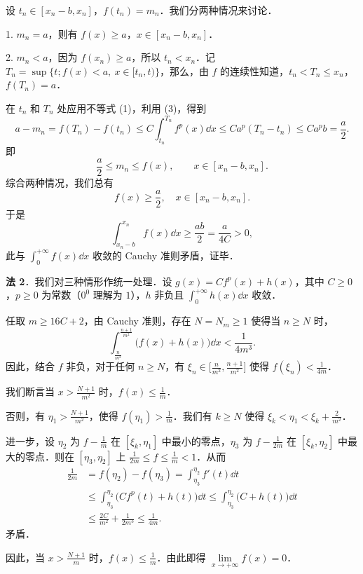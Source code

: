 \begin{solution}
设 $t_{n}\in[x_{n}-b,x_{n}]$，$f(t_{n})=m_{n}$．我们分两种情况来讨论．

1. $m_{n}=a$，则有 $f(x)\ge a$，$x\in[x_{n}-b,x_{n}]$．

2. $m_{n}<a$，因为 $f(x_{n})\ge a$，所以 $t_{n}<x_{n}$．记 $T_{n}=\sup\{t;f(x)<a,\ x\in[t_{n},t)\}$，那么，由 $f$ 的连续性知道，$t_{n}<T_{n}\le x_{n}$，$f(T_{n})=a$．

在 $t_{n}$ 和 $T_{n}$ 处应用不等式 (1)，利用 (3)，得到
\[
a-m_{n}=f(T_{n})-f(t_{n})\le C\int_{t_{n}}^{T_{n}}f^{p}(x)\dd x\le Ca^{p}(T_{n}-t_{n})\le Ca^{p}b=\frac{a}{2}.
\]
即
\[
\frac{a}{2}\le m_{n}\le f(x),\qquad x\in[x_{n}-b,x_{n}].
\]
综合两种情况，我们总有
\[
f(x)\ge\frac{a}{2},\quad x\in[x_{n}-b,x_{n}].
\]
于是
\[
\int_{x_{n}-b}^{x_{n}}f(x)\dd x\ge\frac{ab}{2}=\frac{a}{4C}>0,
\]
此与 $\int_{0}^{+\infty}f(x)\dd x$ 收敛的 Cauchy 准则矛盾，证毕．

\textbf{法 2}．我们对三种情形作统一处理．设 $g(x)=Cf^{p}(x)+h(x)$，其中 $C\ge 0$，$p\ge 0$ 为常数（$0^{0}$ 理解为 $1$），$h$ 非负且 $\int_{0}^{+\infty}h(x)\dd x$ 收敛．

任取 $m\ge 16C+2$，由 Cauchy 准则，存在 $N=N_{m}\ge 1$ 使得当 $n\ge N$ 时，
\[
\int_{\frac{n}{m^{2}}}^{\frac{n+1}{m^{2}}}\bigl(f(x)+h(x)\bigr)\dd x<\frac{1}{4m^{3}}.
\]
因此，结合 $f$ 非负，对于任何 $n\ge N$，有 $\xi_{n}\in\bigl[\frac{n}{m^{2}},\frac{n+1}{m^{2}}\bigr]$ 使得 $f(\xi_{n})<\frac{1}{4m}$．

我们断言当 $x>\frac{N+1}{m^{2}}$ 时，$f(x)\le\frac{1}{m}$．

否则，有 $\eta_{1}>\frac{N+1}{m^{2}}$，使得 $f(\eta_{1})>\frac{1}{m}$．我们有 $k\ge N$ 使得 $\xi_{k}<\eta_{1}<\xi_{k}+\frac{2}{m^{2}}$．

进一步，设 $\eta_{2}$ 为 $f-\frac{1}{m}$ 在 $[\xi_{k},\eta_{1}]$ 中最小的零点，$\eta_{3}$ 为 $f-\frac{1}{2m}$ 在 $[\xi_{k},\eta_{2}]$ 中最大的零点．则在 $[\eta_{3},\eta_{2}]$ 上 $\frac{1}{2m}\le f\le\frac{1}{m}<1$．从而
\begin{align*}
\frac{1}{2m}&=f(\eta_{2})-f(\eta_{3})=\int_{\eta_{3}}^{\eta_{2}}f'(t)\dd t\\
&\le\int_{\eta_{3}}^{\eta_{2}}\bigl(Cf^{p}(t)+h(t)\bigr)\dd t\le\int_{\eta_{3}}^{\eta_{2}}\bigl(C+h(t)\bigr)\dd t\\
&\le\frac{2C}{m^{2}}+\frac{1}{2m^{3}}\le\frac{1}{4m}.
\end{align*}
矛盾．

因此，当 $x>\frac{N+1}{m}$ 时，$f(x)\le\frac{1}{m}$．由此即得 $\lim\limits_{x\to+\infty}f(x)=0$．
\end{solution}
